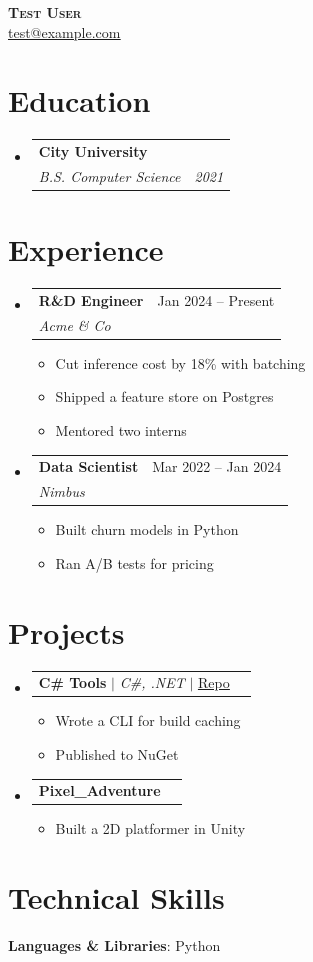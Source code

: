 \documentclass[letterpaper,11pt]{article}
\makeatletter
\newcommand{\resumeItem}[1]{
  \item\small{
    {#1 \vspace{-2pt}}
  }
}
\newcommand{\resumeSubheading}[4]{
  \vspace{-2pt}\item
    \begin{tabular*}{0.97\textwidth}[t]{l@{\extracolsep{\fill}}r}
      \textbf{#1} & #2 \\
      \textit{\small#3} & \textit{\small #4} \\
    \end{tabular*}\vspace{-7pt}
}
\newcommand{\resumeProjectHeading}[2]{
    \item
    \begin{tabular*}{0.97\textwidth}{l@{\extracolsep{\fill}}r}
      \small#1 & #2 \\
    \end{tabular*}\vspace{-7pt}
}
\newcommand{\resumeSubHeadingListStart}{\begin{itemize}[leftmargin=0.15in, label={}]}
\newcommand{\resumeSubHeadingListEnd}{\end{itemize}}
\newcommand{\resumeItemListStart}{\begin{itemize}}
\newcommand{\resumeItemListEnd}{\end{itemize}\vspace{-5pt}}
\makeatother
\begin{document}
\begin{center}
    \textbf{\Huge \scshape Test User} \\ \vspace{1pt}
    \small \href{mailto:test@example.com}{\underline{test@example.com}}
\end{center}

\section{Education}
  \resumeSubHeadingListStart
    \resumeSubheading
      {City University}{}
      {B.S. Computer Science}{2021}
  \resumeSubHeadingListEnd

\section{Experience}
  \resumeSubHeadingListStart

    \resumeSubheading
      {R\&D Engineer}{Jan 2024 -- Present}
      {Acme \& Co}{}
      \resumeItemListStart
        \resumeItem{Cut inference cost by 18\% with batching}
        \resumeItem{Shipped a feature store on Postgres}
        \resumeItem{Mentored two interns}
      \resumeItemListEnd

    \resumeSubheading
      {Data Scientist}{Mar 2022 -- Jan 2024}
      {Nimbus}{}
      \resumeItemListStart
        \resumeItem{Built churn models in Python}
        \resumeItem{Ran A/B tests for pricing}
      \resumeItemListEnd

  \resumeSubHeadingListEnd

\section{Projects}
    \resumeSubHeadingListStart
      \resumeProjectHeading
          {\textbf{C\# Tools} $|$ \emph{C\#, .NET} $|$ \href{https://example.com/r}{\underline{Repo}}}{}
          \resumeItemListStart
            \resumeItem{Wrote a CLI for build caching}
            \resumeItem{Published to NuGet}
          \resumeItemListEnd
      \resumeProjectHeading
          {\textbf{Pixel\_Adventure}}{}
          \resumeItemListStart
            \resumeItem{Built a 2D platformer in Unity}
          \resumeItemListEnd
    \resumeSubHeadingListEnd

\section{Technical Skills}
 \begin{itemize}[leftmargin=0.15in, label={}]
    \small{\item{
     \textbf{Languages \& Libraries}{: Python} \\
    }}
 \end{itemize}
\end{document}
